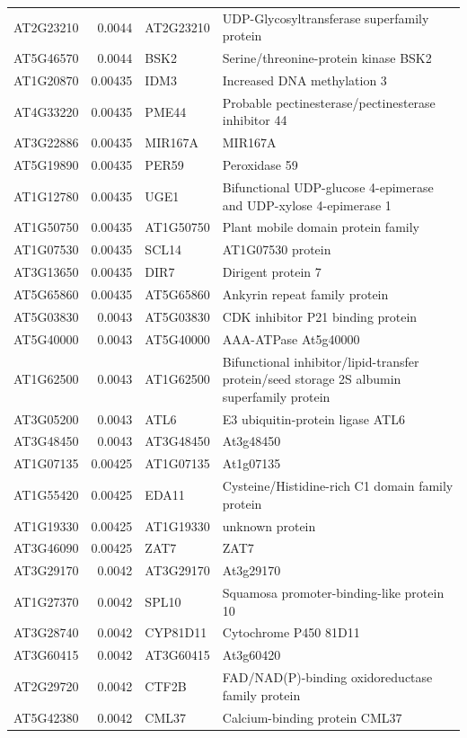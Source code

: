\documentclass[11pt]{article}
\begin{document}
\begin{center}
\begin{tabular}{lrll}
AT2G23210 & 0.0044 & AT2G23210 & UDP-Glycosyltransferase superfamily protein\\
AT5G46570 & 0.0044 & BSK2 & Serine/threonine-protein kinase BSK2\\
AT1G20870 & 0.00435 & IDM3 & Increased DNA methylation 3\\
AT4G33220 & 0.00435 & PME44 & Probable pectinesterase/pectinesterase inhibitor 44\\
AT3G22886 & 0.00435 & MIR167A & MIR167A\\
AT5G19890 & 0.00435 & PER59 & Peroxidase 59\\
AT1G12780 & 0.00435 & UGE1 & Bifunctional UDP-glucose 4-epimerase and UDP-xylose 4-epimerase 1\\
AT1G50750 & 0.00435 & AT1G50750 & Plant mobile domain protein family\\
AT1G07530 & 0.00435 & SCL14 & AT1G07530 protein\\
AT3G13650 & 0.00435 & DIR7 & Dirigent protein 7\\
AT5G65860 & 0.00435 & AT5G65860 & Ankyrin repeat family protein\\
AT5G03830 & 0.0043 & AT5G03830 & CDK inhibitor P21 binding protein\\
AT5G40000 & 0.0043 & AT5G40000 & AAA-ATPase At5g40000\\
AT1G62500 & 0.0043 & AT1G62500 & Bifunctional inhibitor/lipid-transfer protein/seed storage 2S albumin superfamily protein\\
AT3G05200 & 0.0043 & ATL6 & E3 ubiquitin-protein ligase ATL6\\
AT3G48450 & 0.0043 & AT3G48450 & At3g48450\\
AT1G07135 & 0.00425 & AT1G07135 & At1g07135\\
AT1G55420 & 0.00425 & EDA11 & Cysteine/Histidine-rich C1 domain family protein\\
AT1G19330 & 0.00425 & AT1G19330 & unknown protein\\
AT3G46090 & 0.00425 & ZAT7 & ZAT7\\
AT3G29170 & 0.0042 & AT3G29170 & At3g29170\\
AT1G27370 & 0.0042 & SPL10 & Squamosa promoter-binding-like protein 10\\
AT3G28740 & 0.0042 & CYP81D11 & Cytochrome P450 81D11\\
AT3G60415 & 0.0042 & AT3G60415 & At3g60420\\
AT2G29720 & 0.0042 & CTF2B & FAD/NAD(P)-binding oxidoreductase family protein\\
AT5G42380 & 0.0042 & CML37 & Calcium-binding protein CML37\\

\end{tabular}
\end{center}
\end{document}
